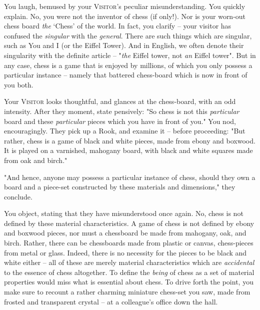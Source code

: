 You laugh, bemused by your \textsc{Visitor}'s peculiar misunderstanding. You quickly explain. No, you were not the inventor of chess (if only!). Nor is your worn-out chess board \emph{the} `Chess' of the world. In fact, you clarify -- your visitor has confused the \emph{singular} with the \emph{general}. There are such things which are singular, such as You and I (or the Eiffel Tower). And in English, we often denote their singularity with the definite article -- "\emph{the} Eiffel tower, not \emph{an} Eiffel tower". But in any case, chess is a game that is enjoyed by millions, of which you only possess a particular instance -- namely that battered chess-board which is now in front of you both.



Your \textsc{Visitor} looks thoughtful, and glances at the chess-board, with an odd intensity. After they moment, state pensively: "So chess is not this \emph{particular} board and these \emph{particular} pieces which you have in front of you." You nod, encouragingly. They pick up a Rook, and examine it -- before proceeding: "But rather, chess is a game of black and white pieces, made from ebony and boxwood. It is played on a varnished, mahogany board, with black and white squares made from oak and birch."

"And hence, anyone may possess a particular instance of chess, should they own a board and a piece-set constructed by these materials and dimensions," they conclude.

You object, stating that they have misunderstood once again. No, chess is not defined by these material characteristics. A game of chess is not defined by ebony and boxwood pieces, nor must a chessboard be made from mahogany, oak, and birch. Rather, there can be chessboards made from plastic or canvas, chess-pieces from metal or glass. Indeed, there is no necessity for the pieces to be black and white either -- all of these are merely material characteristics which are \emph{accidental} to the essence of chess altogether. To define the \emph{being} of chess as a set of material properties would miss what is essential about chess. To drive forth the point, you make sure to recount a rather charming miniature chess-set you saw, made from frosted and transparent crystal -- at a colleague's office down the hall.


